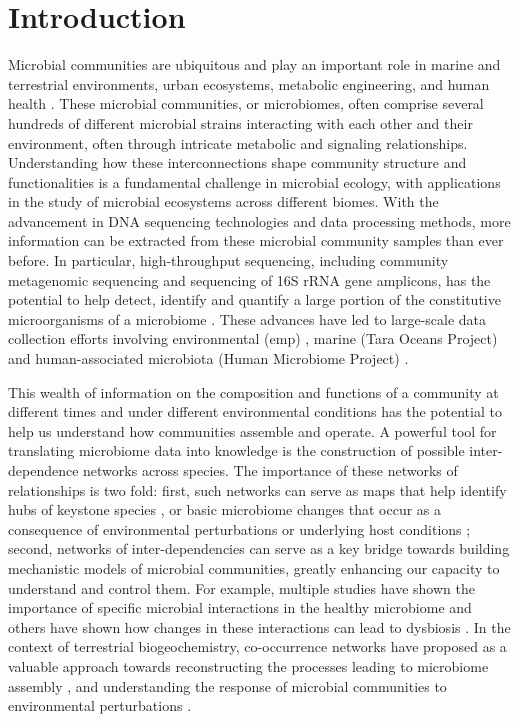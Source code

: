 
\section*{Introduction}

  Microbial communities are ubiquitous and play an important role in marine and terrestrial environments, urban ecosystems, metabolic engineering, and human health \cite{Ghoul2016,Thompson2017}.
  These microbial communities, or microbiomes, often comprise several hundreds of different microbial strains interacting with each other and their environment, often through intricate metabolic and signaling relationships.
  Understanding how these interconnections shape community structure and functionalities is a fundamental challenge in microbial ecology, with applications in the study of microbial ecosystems across different biomes. 
  With the advancement in DNA sequencing technologies \cite{Narihiro2017} and data processing methods,  more information can be extracted from these microbial community samples than ever before.
  In particular, high-throughput sequencing, including community metagenomic sequencing and sequencing of 16S rRNA gene amplicons, has the potential to help detect, identify and quantify a large portion of the constitutive microorganisms of a microbiome \cite{Jovel2016,Lloyd-Price2016}.
  These advances have led to large-scale data collection efforts involving environmental (\acl{emp}) \cite{Thompson2017}, marine (Tara Oceans Project) \cite{Zhang2015} and human-associated microbiota (Human Microbiome Project) \cite{HumanMicrobiomeProjectConsortium2012}.

 This wealth of information on the composition and functions of a community at different times and under different environmental conditions has the potential to help us understand how communities assemble and operate.
 A powerful tool for translating microbiome data into knowledge is the construction of possible inter-dependence networks across species.
 The importance of these networks of relationships is two fold: first, such networks can serve as maps that help identify hubs of keystone species \cite{Menon2018,Rottjers2018}, or basic microbiome changes that occur as a consequence of environmental perturbations or underlying host conditions \cite{Gilbert2016}; second, networks of inter-dependencies can serve as a key bridge towards building mechanistic models of microbial communities, greatly enhancing our capacity to understand and control them.
 For example, multiple studies have shown the importance of specific microbial interactions in the healthy microbiome \cite{Lloyd-Price2016} and others have shown how changes in these interactions can lead to dysbiosis \cite{Wang2017,Gilbert2016,Belizario2015}.
 In the context of terrestrial biogeochemistry, co-occurrence networks have proposed as a valuable approach towards reconstructing the processes leading to microbiome assembly \cite{Fierer2017}, and understanding the response of microbial communities to environmental perturbations \cite{Jiao2019}.

